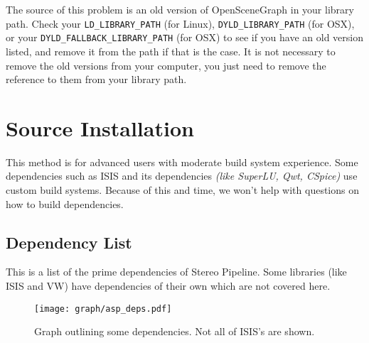The source of this problem is an old version of OpenSceneGraph in
your library path. Check your \verb#LD_LIBRARY_PATH# (for Linux),
\verb#DYLD_LIBRARY_PATH# (for OSX), or your \verb#DYLD_FALLBACK_LIBRARY_PATH#
(for OSX) to see if you have an old version listed, and remove it
from the path if that is the case. It is not necessary to remove the
old versions from your computer, you just need to remove the reference
to them from your library path.

\pagebreak
\section{\label{sec:Source-Installation}Source Installation}

This method is for advanced users with moderate build system
experience. Some dependencies such as ISIS and its dependencies
\emph{(like SuperLU, Qwt, CSpice)} use custom build systems. Because
of this and time, we won't help with questions on how to build
dependencies.

\subsection{Dependency List}

This is a list of the prime dependencies of Stereo Pipeline. Some libraries
(like \ac{ISIS} and \ac{VW}) have dependencies of their own which are not covered here.

\begin{figure}[h]
  \centering
  \texttt{[image: graph/asp\_deps.pdf]}
  \caption{Graph outlining some dependencies. Not all of ISIS's are shown.}
\end{figure}

